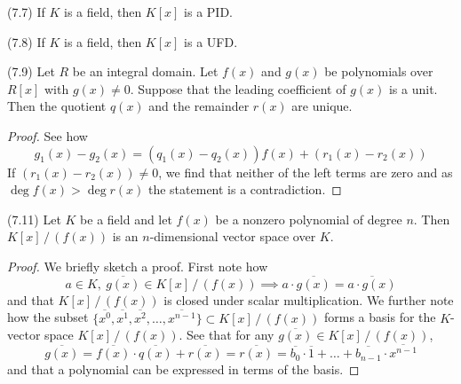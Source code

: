 \vspace{2ex}
\begin{cor}
(7.7) If $K$ is a field, then $K[x]$ is a PID. 
\end{cor}
\vspace{2ex}
\begin{cor}
(7.8) If $K$ is a field, then $K[x]$ is a UFD. 
\end{cor}
\vspace{2ex}
\begin{prop}
(7.9) Let $R$ be an integral domain. Let $f(x)$ and $g(x)$ be polynomials over $R[x]$ with $g(x)\ne 0$. Suppose that the leading coefficient of $g(x)$ is a unit. Then the quotient $q(x)$ and the remainder $r(x)$ are unique.
\end{prop}
\vspace{2ex}
\begin{proof}
See how
\[g_1(x)-g_2(x)=(q_1(x)-q_2(x))f(x)+(r_1(x)-r_2(x))\]
If $(r_1(x)-r_2(x))\ne 0$, we find that neither of the left terms are zero and as $\mathop{\mathrm{deg}}f(x)>\mathop{\mathrm{deg}}r(x)$ the statement is a contradiction. 
\end{proof}
\vspace{2ex}
\begin{thm}
(7.11) Let $K$ be a field and let $f(x)$ be a nonzero polynomial of degree $n$. Then $K[x]\,/\,(f(x))$ is an $n$-dimensional vector space over $K$. 
\end{thm}
\vspace{2ex}
\begin{proof}
We briefly sketch a proof. First note how
\[a\in K,\ \overline{g(x)}\in K[x]\,/\,(f(x))\implies a\cdot \overline{g(x)}=\overline{a\cdot g(x)}\]
and that $K[x]\,/\,(f(x))$ is closed under scalar multiplication. We further note how the subset $\{\overline{x^{0}},\overline{x^{1}},\overline{x^2},\ldots ,\overline{x^{n-1}} \}\subset K[x]\,/\,(f(x))$ forms a basis for the $K$-vector space $K[x]\,/\,(f(x))$. See that for any $\overline{g(x)}\in K[x]\,/\,(f(x))$, 
\[\overline{g(x)}=\overline{f(x)}\cdot \overline{q(x)}+\overline{r(x)}=\overline{r(x)}=\overline{b_0}\cdot \overline{1}+\ldots +\overline{b_{n-1}}\cdot \overline{x^{n-1}}\]
and that a polynomial can be expressed in terms of the basis. 
\end{proof}
\vspace{2ex}

